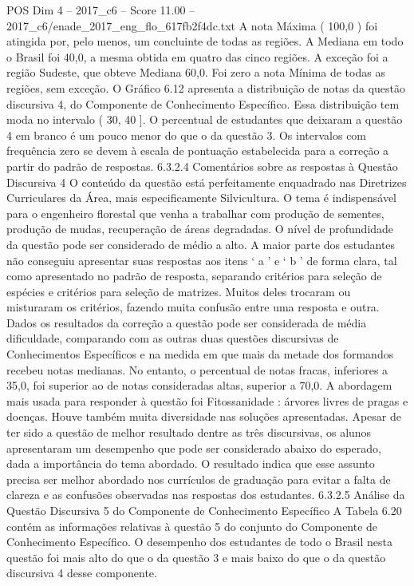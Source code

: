 \begin{textsample}{POS Dim 4 – 2017\_c6 – Score 11.00 – 2017\_c6/enade\_2017\_eng\_flo\_617fb2f4dc.txt}
A nota Máxima ( 100,0 ) foi atingida por, pelo menos, um concluinte de todas as regiões.
A Mediana em todo o Brasil foi 40,0, a mesma obtida em quatro das cinco regiões.
A exceção foi a região Sudeste, que obteve Mediana 60,0.
Foi zero a nota Mínima de todas as regiões, sem exceção.
O Gráfico 6.12 apresenta a distribuição de notas da questão discursiva 4, do Componente de Conhecimento Específico.
Essa distribuição tem moda no intervalo ( 30, 40 ].
O percentual de estudantes que deixaram a questão 4 em branco é um pouco menor do que o da questão 3.
Os intervalos com frequência zero se devem à escala de pontuação estabelecida para a correção a partir do padrão de respostas. 6.3.2.4 Comentários sobre as respostas à Questão Discursiva 4 O conteúdo da questão está perfeitamente enquadrado nas Diretrizes Curriculares da Área, mais especificamente Silvicultura.
O tema é indispensável para o engenheiro florestal que venha a trabalhar com produção de sementes, produção de mudas, recuperação de áreas degradadas.
O nível de profundidade da questão pode ser considerado de médio a alto.
A maior parte dos estudantes não conseguiu apresentar suas respostas aos itens ‘ a ’ e ‘ b ’ de forma clara, tal como apresentado no padrão de resposta, separando critérios para seleção de espécies e critérios para seleção de matrizes.
Muitos deles trocaram ou misturaram os critérios, fazendo muita confusão entre uma resposta e outra.
Dados os resultados da correção a questão pode ser considerada de média dificuldade, comparando com as outras duas questões discursivas de Conhecimentos Específicos e na medida em que mais da metade dos formandos recebeu notas medianas.
No entanto, o percentual de notas fracas, inferiores a 35,0, foi superior ao de notas consideradas altas, superior a 70,0.
A abordagem mais usada para responder à questão foi Fitossanidade : árvores livres de pragas e doenças.
Houve também muita diversidade nas soluções apresentadas.
Apesar de ter sido a questão de melhor resultado dentre as três discursivas, os alunos apresentaram um desempenho que pode ser considerado abaixo do esperado, dada a importância do tema abordado.
O resultado indica que esse assunto precisa ser melhor abordado nos currículos de graduação para evitar a falta de clareza e as confusões observadas nas respostas dos estudantes. 6.3.2.5 Análise da Questão Discursiva 5 do Componente de Conhecimento Específico A Tabela 6.20 contém as informações relativas à questão 5 do conjunto do Componente de Conhecimento Específico.
O desempenho dos estudantes de todo o Brasil nesta questão foi mais alto do que o da questão 3 e mais baixo do que o da questão discursiva 4 desse componente.

\end{textsample}
